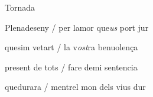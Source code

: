 \documentclass[12pt]{article}
\begin{document}
\begin{estrofaExtra}%




\begin{tornada}

Tornada

\end{tornada}


\end{estrofaExtra}


\begin{estrofa}

 Plenadeseny / per lamor que\textit{us} port jur

 quesim vetart / la v\textit{ost}ra benuolen\c{c}a

 present de tots / fare demi sentencia

 quedurara / mentrel mon dels vius dur

\end{estrofa}
\end{document}
